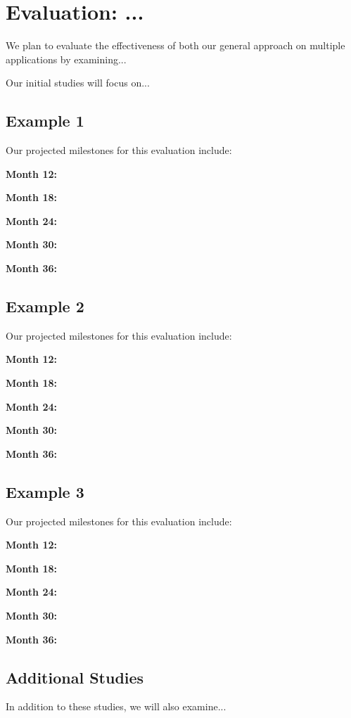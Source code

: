 \section{Evaluation: ...}

We plan to evaluate the effectiveness of both our general approach
on multiple applications by examining... 

 Our initial studies will focus on...

\subsection{Example 1}
Our projected milestones for this evaluation include:
\begin{compactitem}
\item[\textbf{Month 12:}] 
\item[\textbf{Month 18:}] 
\item[\textbf{Month 24:}]
\item[\textbf{Month 30:}]
\item[\textbf{Month 36:}]
\end{compactitem}

\subsection{Example 2}
Our projected milestones for this evaluation include:
\begin{compactitem}
\item[\textbf{Month 12:}] 
\item[\textbf{Month 18:}] 
\item[\textbf{Month 24:}]
\item[\textbf{Month 30:}]
\item[\textbf{Month 36:}]
\end{compactitem}

\subsection{Example 3}
Our projected milestones for this evaluation include:
\begin{compactitem}
\item[\textbf{Month 12:}] 
\item[\textbf{Month 18:}] 
\item[\textbf{Month 24:}]
\item[\textbf{Month 30:}]
\item[\textbf{Month 36:}]
\end{compactitem}

\subsection{Additional Studies}

In addition to these studies, we will also examine...
